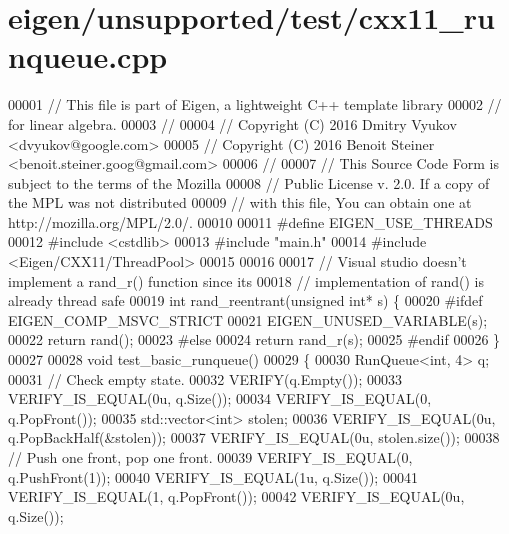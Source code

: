 \hypertarget{eigen_2unsupported_2test_2cxx11__runqueue_8cpp_source}{}\section{eigen/unsupported/test/cxx11\+\_\+runqueue.cpp}
\label{eigen_2unsupported_2test_2cxx11__runqueue_8cpp_source}

\begin{DoxyCode}
00001 \textcolor{comment}{// This file is part of Eigen, a lightweight C++ template library}
00002 \textcolor{comment}{// for linear algebra.}
00003 \textcolor{comment}{//}
00004 \textcolor{comment}{// Copyright (C) 2016 Dmitry Vyukov <dvyukov@google.com>}
00005 \textcolor{comment}{// Copyright (C) 2016 Benoit Steiner <benoit.steiner.goog@gmail.com>}
00006 \textcolor{comment}{//}
00007 \textcolor{comment}{// This Source Code Form is subject to the terms of the Mozilla}
00008 \textcolor{comment}{// Public License v. 2.0. If a copy of the MPL was not distributed}
00009 \textcolor{comment}{// with this file, You can obtain one at http://mozilla.org/MPL/2.0/.}
00010 
00011 \textcolor{preprocessor}{#define EIGEN\_USE\_THREADS}
00012 \textcolor{preprocessor}{#include <cstdlib>}
00013 \textcolor{preprocessor}{#include "main.h"}
00014 \textcolor{preprocessor}{#include <Eigen/CXX11/ThreadPool>}
00015 
00016 
00017 \textcolor{comment}{// Visual studio doesn't implement a rand\_r() function since its}
00018 \textcolor{comment}{// implementation of rand() is already thread safe}
00019 \textcolor{keywordtype}{int} rand\_reentrant(\textcolor{keywordtype}{unsigned} \textcolor{keywordtype}{int}* s) \{
00020 \textcolor{preprocessor}{#ifdef EIGEN\_COMP\_MSVC\_STRICT}
00021   EIGEN\_UNUSED\_VARIABLE(s);
00022   \textcolor{keywordflow}{return} rand();
00023 \textcolor{preprocessor}{#else}
00024   \textcolor{keywordflow}{return} rand\_r(s);
00025 \textcolor{preprocessor}{#endif}
00026 \}
00027 
00028 \textcolor{keywordtype}{void} test\_basic\_runqueue()
00029 \{
00030   RunQueue<int, 4> q;
00031   \textcolor{comment}{// Check empty state.}
00032   VERIFY(q.Empty());
00033   VERIFY\_IS\_EQUAL(0u, q.Size());
00034   VERIFY\_IS\_EQUAL(0, q.PopFront());
00035   std::vector<int> stolen;
00036   VERIFY\_IS\_EQUAL(0u, q.PopBackHalf(&stolen));
00037   VERIFY\_IS\_EQUAL(0u, stolen.size());
00038   \textcolor{comment}{// Push one front, pop one front.}
00039   VERIFY\_IS\_EQUAL(0, q.PushFront(1));
00040   VERIFY\_IS\_EQUAL(1u, q.Size());
00041   VERIFY\_IS\_EQUAL(1, q.PopFront());
00042   VERIFY\_IS\_EQUAL(0u, q.Size());

\end{DoxyCode}
